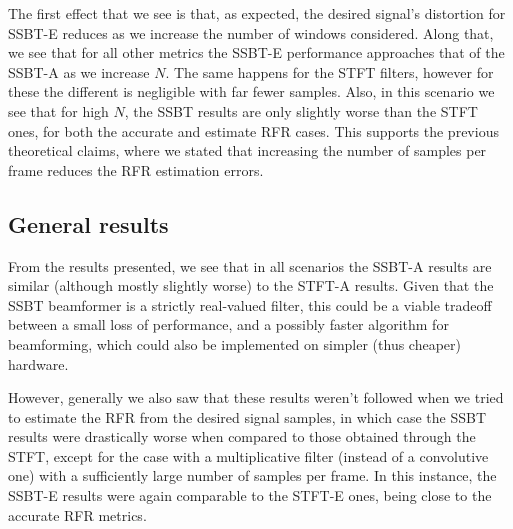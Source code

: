 The first effect that we see is that, as expected, the desired signal's distortion for SSBT-E reduces as we increase the number of windows considered. Along that, we see that for all other metrics the SSBT-E performance approaches that of the SSBT-A as we increase $N$. The same happens for the STFT filters, however for these the different is negligible with far fewer samples. Also, in this scenario we see that for high $N$, the SSBT results are only slightly worse than the STFT ones, for both the accurate and estimate RFR cases. This supports the previous theoretical claims, where we stated that increasing the number of samples per frame reduces the RFR estimation errors.

\subsection{General results}

From the results presented, we see that in all scenarios the SSBT-A results are similar (although mostly slightly worse) to the STFT-A results. Given that the SSBT beamformer is a strictly real-valued filter, this could be a viable tradeoff between a small loss of performance, and a possibly faster algorithm for beamforming, which could also be implemented on simpler (thus cheaper) hardware.

However, generally we also saw that these results weren't followed when we tried to estimate the RFR from the desired signal samples, in which case the SSBT results were drastically worse when compared to those obtained through the STFT, except for the case with a multiplicative filter (instead of a convolutive one) with a sufficiently large number of samples per frame. In this instance, the SSBT-E results were again comparable to the STFT-E ones, being close to the accurate RFR metrics.